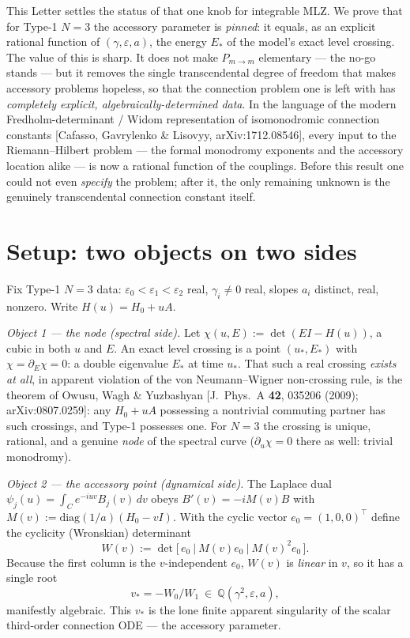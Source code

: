 \documentclass[aps,prl,reprint,nofootinbib,superscriptaddress]{revtex4-2}
\newcommand{\eps}{\varepsilon}
\newcommand{\Pmid}{P_{m\to m}}
\newcommand{\Z}{\mathbb{Q}}
\newcommand{\diag}{\mathrm{diag}}
\begin{document}
This Letter settles the status of that one knob for integrable MLZ. We prove that for Type-1 $N{=}3$
the accessory parameter is \emph{pinned}: it equals, as an explicit rational function of
$(\gamma,\eps,a)$, the energy $E_*$ of the model's exact level crossing. The value of this is sharp.
It does not make $\Pmid$ elementary --- the no-go stands --- but it removes the single transcendental
degree of freedom that makes accessory problems hopeless, so that the connection problem one is left
with has \emph{completely explicit, algebraically-determined data}. In the language of the modern
Fredholm-determinant / Widom representation of isomonodromic connection constants [Cafasso, Gavrylenko \&
Lisovyy, arXiv:1712.08546], every input to the Riemann--Hilbert problem --- the formal monodromy
exponents and the accessory location alike --- is now a rational function of the couplings. Before
this result one could not even \emph{specify} the problem; after it, the only remaining unknown is the
genuinely transcendental connection constant itself.

\section{Setup: two objects on two sides}
Fix Type-1 $N{=}3$ data: $\eps_0<\eps_1<\eps_2$ real, $\gamma_i\neq0$ real, slopes $a_i$ distinct,
real, nonzero. Write $H(u)=H_0+uA$.

\emph{Object 1 --- the node (spectral side).} Let $\chi(u,E):=\det(EI-H(u))$, a cubic in both $u$ and
$E$. An exact level crossing is a point $(u_*,E_*)$ with $\chi=\partial_E\chi=0$: a double eigenvalue
$E_*$ at time $u_*$. That such a real crossing \emph{exists at all}, in apparent violation of the von
Neumann--Wigner non-crossing rule, is the theorem of Owusu, Wagh \& Yuzbashyan [J.\ Phys.\ A
\textbf{42}, 035206 (2009); arXiv:0807.0259]: any $H_0+uA$ possessing a nontrivial commuting partner
has such crossings, and Type-1 possesses one. For $N{=}3$ the crossing is unique, rational, and a
genuine \emph{node} of the spectral curve ($\partial_u\chi=0$ there as well: trivial monodromy).

\emph{Object 2 --- the accessory point (dynamical side).} The Laplace dual
$\psi_j(u)=\int_C e^{-iuv}B_j(v)\,dv$ obeys $B'(v)=-iM(v)B$ with $M(v):=\diag(1/a)(H_0-vI)$. With the
cyclic vector $e_0=(1,0,0)^{\!\top}$ define the cyclicity (Wronskian) determinant
\begin{equation}
W(v):=\det\!\big[\,e_0\ \big|\ M(v)e_0\ \big|\ M(v)^2 e_0\,\big].
\end{equation}
Because the first column is the $v$-independent $e_0$, $W(v)$ is \emph{linear} in $v$, so it has a
single root
\begin{equation}
v_*=-W_0/W_1\ \in\ \Z(\gamma^2,\eps,a),
\end{equation}
manifestly algebraic. This $v_*$ is the lone finite apparent singularity of the scalar third-order
connection ODE --- the accessory parameter.
\end{document}
